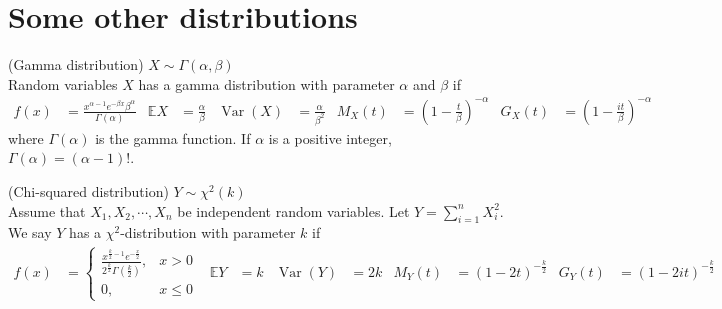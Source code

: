 \documentclass{huhtakm-template-book}
\newcommand{\expect}{\mathbb{E}}
\DeclareMathOperator{\Var}{Var}
\begin{document}
\chapter{Some other distributions}
\begin{eg}(Gamma distribution) $X\sim\Gamma(\alpha,\beta)$\\
    Random variables $X$ has a gamma distribution with parameter $\alpha$ and $\beta$ if
    \begin{align*}
        f(x)&=\frac{x^{\alpha-1}e^{-\beta x}\beta^{\alpha}}{\Gamma(\alpha)} & \expect X&=\frac{\alpha}{\beta} & \Var(X)&=\frac{\alpha}{\beta^{2}} & M_{X}(t)&=\left(1-\frac{t}{\beta}\right)^{-\alpha} & G_{X}(t)&=\left(1-\frac{it}{\beta}\right)^{-\alpha}
    \end{align*}
    where $\Gamma(\alpha)$ is the gamma function. If $\alpha$ is a positive integer, $\Gamma(\alpha)=(\alpha-1)!$.
\end{eg}
\begin{eg}(Chi-squared distribution) $Y\sim\chi^{2}(k)$\\
    Assume that $X_{1},X_{2},\cdots,X_{n}$ be independent random variables. Let $Y=\sum_{i=1}^{n}X_{i}^{2}$. We say $Y$ has a $\chi^{2}$-distribution with parameter $k$ if
    \begin{align*}
        f(x)&=\begin{cases}
            \frac{x^{\frac{k}{2}-1}e^{-\frac{x}{2}}}{2^{\frac{k}{2}}\Gamma\left(\frac{k}{2}\right)}, &x>0\\
            0, &x\leq 0
        \end{cases} & \expect Y&=k & \Var(Y)&=2k & M_{Y}(t)&=(1-2t)^{-\frac{k}{2}} & G_{Y}(t)&=(1-2it)^{-\frac{k}{2}}
    \end{align*}
\end{eg}
\end{document}
